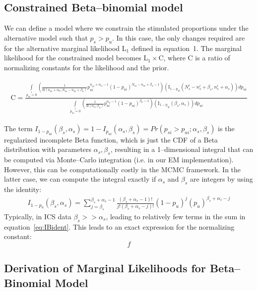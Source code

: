 \documentclass{article}
\begin{document}
\subsection{Constrained Beta--binomial model}
\label{supp:constrained}
We can define a model where we constrain the stimulated proportions under the alternative model such that $p_s>p_u$. In this case, the only changes required are for the alternative marginal likelihood $\mathrm{L}_1$ defined in equation~1. The marginal likelihood for the constrained model becomes $\mathrm{L}_1\times \mathrm{C}$, where $\mathrm{C}$ is a ratio of normalizing constants for the likelihood and the prior.

\begin{align*}
\begin{split}
	 \mathrm{C}=\frac{\int\limits_{p_{ui}=0}\limits^{1}\left(\frac{1}{\mathrm{B}(n_{ui}+\alpha_u,N_{ui}-n_{ui}+\beta_u)}p_{ui}^{n_{ui}+\alpha_u-1}(1-p_{ui})^{N_{ui}-n_{ui}+\beta_u-1} \right)\left(\mathrm{I_{1-p_{ui}}}(N^i_s-n^i_s+\beta_s,n^i_s+\alpha_s)\right)d p_{ui}}{   \int\limits_{p_{ui}=0}\limits^{1}\left(\frac{1}{\mathrm{B}(\alpha_u,\beta_u)}p_{ui}^{\alpha_u-1}(1-p_{ui})^{\beta_u-1} \right)\left(\mathrm{I_{1-p_{ui}}}(\beta_s,\alpha_s)\right)d p_{ui}}
\end{split}
\end{align*}
 
The term $I_{1-p_{ui}}(\beta_s,\alpha_s)=1-I_{p_{ui}}(\alpha_s,\beta_s)=Pr(p_{si} > p_{ui}; \alpha_s,\beta_s)$ is the regularized incomplete Beta function, which is just the CDF of a Beta distribution with parameters $\alpha_s,\beta_s$, resulting in a 1--dimensional integral that can be computed via Monte--Carlo integration (i.e. in our EM implementation). However, this can be computationally costly in the MCMC framework. In the latter case, we can compute the integral exactly if $\alpha_s$ and $\beta_s$ are integers by using the identity:
\begin{align}
I_{1-p_u}(\beta_s,\alpha_s) = \sum_{j=\beta_s}^{\beta_s+\alpha_s-1} \frac{(\beta_s+\alpha_s-1)!}{j!(\beta_s+\alpha_s-j)!}(1-p_u)^j(p_u)^{\beta_s+\alpha_s-j}
\label{eq:IBident}
\end{align}
Typically, in ICS data $\beta_s>>\alpha_s$, leading to relatively few terms in the sum in equation~\ref{eq:IBident}.  This leads to an exact expression for the normalizing constant:
$$
f
$$

\subsection{Derivation of Marginal Likelihoods for Beta--Binomial Model}
\end{document}
